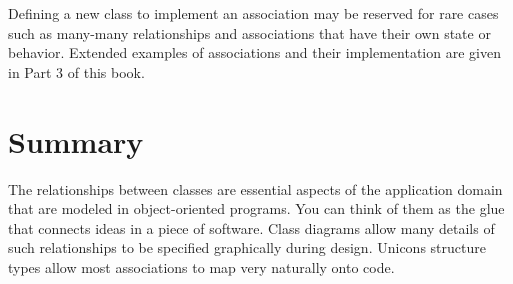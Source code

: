 Defining a new class to implement an association may be reserved for
rare cases such as many-many relationships and associations that have
their own state or behavior. Extended examples of associations and
their implementation are given in Part 3 of this book.

\section*{Summary}

The relationships between classes are essential aspects of the
application domain that are modeled in object-oriented programs. You
can think of them as the {\textquotedbl}glue{\textquotedbl} that
connects ideas in a piece of software. Class diagrams allow many
details of such relationships to be specified graphically during
design. Unicon{\textquotesingle}s structure types allow most
associations to map very naturally onto code.

\clearpage
\bigskip
